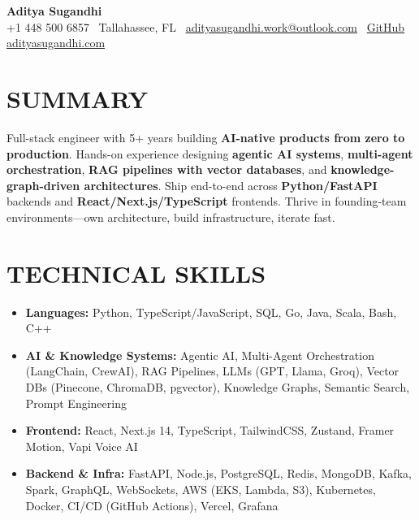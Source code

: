 \documentclass[letterpaper,10pt]{article}
\newcommand{\resumeItem}[1]{\item\small #1}
\begin{document}
\begin{center}
{\huge\textbf{Aditya Sugandhi}} \\
+1 448 500 6857 \textbar\ \textcolor{metablue}{Tallahassee, FL} \textbar\
\href{mailto:adityasugandhi.work@outlook.com}{adityasugandhi.work@outlook.com} \textbar\
\href{https://github.com/adityasugandhi}{GitHub}
\textbar \href{https://adityasugandhi.com}{adityasugandhi.com}
\end{center}
\vspace{-14pt}

\section{\textcolor{metablue}{SUMMARY}}
\small
\vspace{-4pt}
Full-stack engineer with 5+ years building \textbf{AI-native products from zero to production}. Hands-on experience designing \textbf{agentic AI systems}, \textbf{multi-agent orchestration}, \textbf{RAG pipelines with vector databases}, and \textbf{knowledge-graph-driven architectures}. Ship end-to-end across \textbf{Python/FastAPI} backends and \textbf{React/Next.js/TypeScript} frontends. Thrive in founding-team environments---own architecture, build infrastructure, iterate fast.

\vspace{-9pt}

\section{\textcolor{metablue}{TECHNICAL SKILLS}}
\vspace{-4pt}
\small
\begin{itemize}
\resumeItem{\textbf{Languages:} Python, TypeScript/JavaScript, SQL, Go, Java, Scala, Bash, C++}
\resumeItem{\textbf{AI \& Knowledge Systems:} Agentic AI, Multi-Agent Orchestration (LangChain, CrewAI), RAG Pipelines, LLMs (GPT, Llama, Groq), Vector DBs (Pinecone, ChromaDB, pgvector), Knowledge Graphs, Semantic Search, Prompt Engineering}
\resumeItem{\textbf{Frontend:} React, Next.js 14, TypeScript, TailwindCSS, Zustand, Framer Motion, Vapi Voice AI}
\resumeItem{\textbf{Backend \& Infra:} FastAPI, Node.js, PostgreSQL, Redis, MongoDB, Kafka, Spark, GraphQL, WebSockets, AWS (EKS, Lambda, S3), Kubernetes, Docker, CI/CD (GitHub Actions), Vercel, Grafana}
\end{itemize}
\vspace{-10pt}
\end{document}
